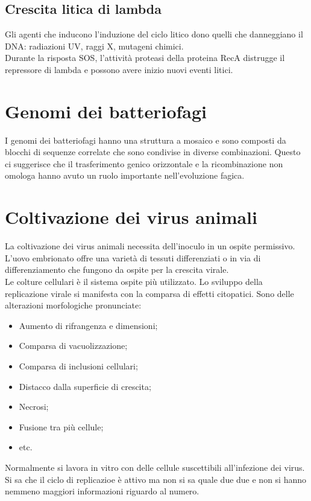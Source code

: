 \subsection{Crescita litica di lambda}
Gli agenti che inducono l'induzione del ciclo litico dono quelli che danneggiano il DNA: radiazioni UV, raggi X, mutageni chimici. 
\\Durante la risposta SOS, l'attività proteasi della proteina RecA distrugge il repressore di lambda e possono avere inizio nuovi eventi litici. 
\section{Genomi dei batteriofagi}
I genomi dei batteriofagi hanno una struttura a mosaico e sono composti da blocchi di sequenze correlate che sono condivise in diverse combinazioni. Questo ci suggerisce che il trasferimento genico orizzontale e la ricombinazione non omologa hanno avuto un ruolo importante nell'evoluzione fagica. 
\section{Coltivazione dei virus animali}
La coltivazione dei virus animali necessita dell'inoculo in un ospite permissivo. L'uovo embrionato offre una varietà di tessuti differenziati o in via di differenziamento che fungono da ospite per la crescita virale.
\\Le colture cellulari è il sistema ospite più utilizzato. Lo sviluppo della replicazione virale si manifesta con la comparsa di effetti citopatici. Sono delle alterazioni morfologiche pronunciate:
\begin{itemize}
    \item Aumento di rifrangenza e dimensioni;
    \item Comparsa di vacuolizzazione; 
    \item Comparsa di inclusioni cellulari; 
    \item Distacco dalla superficie di crescita;
    \item Necrosi; 
    \item Fusione tra più cellule; 
    \item etc.
\end{itemize}
Normalmente si lavora in vitro con delle cellule suscettibili all'infezione dei virus. 
\\Si sa che il ciclo di replicazioe è attivo ma non si sa quale due due e non si hanno nemmeno maggiori informazioni riguardo al numero.

